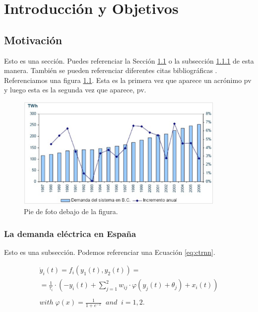 \chapter{Introducci\'{o}n y Objetivos}
\label{chap:intro}
\graphicspath{{../figs/chap_intro/}} 

\section{Motivaci\'{o}n}
\label{sec:sec1}

Esto es una sección.
Puedes referenciar la Sección \ref{sec:sec1} o la subsección \ref{sec:subsec} de esta manera.
También se pueden referenciar diferentes citas bibliográficas \citep{ExArt01,ExIncollec01,ExInpro01,ExTech01,ExBook01,ExPHD01}.
Referenciamos una figura \ref{fig:fig1}. 
Esta es la primera vez que aparece un acrónimo \gls{pv} y luego esta es la segunda vez que aparece, \gls{pv}. 

\begin{figure}[htb]
	\centering
	\includegraphics[width=0.9\textwidth]{creci_dem.eps} 
  \caption[Descripción corta para el índice]
  {Pie de foto debajo de la figura.}
	\label{fig:fig1}                                               
\end{figure}

\subsection{La demanda el\'{e}ctrica en España}
\label{sec:subsec}

Esto es una subsección. 
Podemos referenciar una Ecuación \ref{eq:ctrnn}.

\begin{equation}
  \begin{array}{l}
    \dot y_{i}(t)= f_i(y_1(t),y_2(t)) = \\ 
    = \frac{1}{\tau_i}\cdot\left(-y_i(t)+\sum_{j=1}^2w_{ij}\cdot \varphi\left(y_j(t)+\theta_j\right)+x_i(t)\right) \\\\
    with\;\varphi(x)=\frac{1}{1+e^{-x}}\;\;and\;\;i=1,2.
  \end{array}
  \label{eq:ctrnn}
\end{equation}

